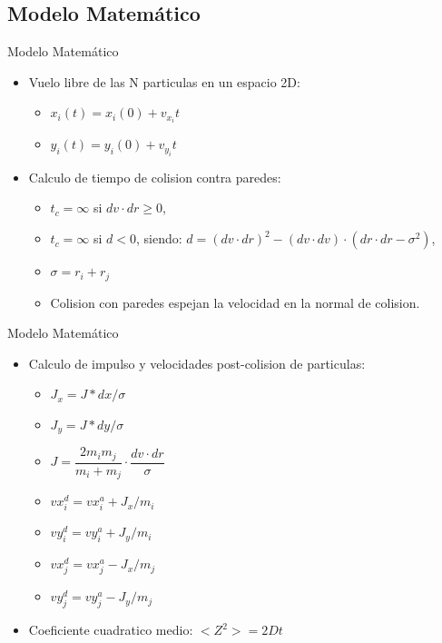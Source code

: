 \documentclass{beamer}
\begin{document}
\subsection{Modelo Matemático}
\begin{frame}{Modelo Matemático}
  \begin{itemize}
    \item Vuelo libre de las N particulas en un espacio 2D:
      \begin{itemize}
        \item $x_i(t) = x_i(0) + v_{x_i} t$
        \item $y_i(t) = y_i(0) + v_{y_i} t$
      \end{itemize}
    \item Calculo de tiempo de colision contra paredes:
      \begin{itemize}
        \item $t_{c} = \infty$ si $dv \cdot dr \geqslant 0$,
      \item $t_{c} = \infty$ si $d < 0$, siendo: $d = (dv \cdot dr)^2 - (dv \cdot dv)\cdot(dr \cdot dr - \sigma^2 )$,
        \item $\sigma = r_i + r_j$
        \item Colision con paredes espejan la velocidad en la normal de colision.
      \end{itemize}
  \end{itemize}
\end{frame}

\begin{frame}{Modelo Matemático}
  \begin{itemize}
    \item Calculo de impulso y velocidades post-colision de particulas:
      \begin{itemize}
        \item $J_x = J*dx/\sigma$
        \item $J_y = J*dy/\sigma$
        \item $J = \dfrac{2 m_i m_j}{m_i + m_j} \cdot \dfrac{dv \cdot dr}{\sigma}$
        \item $vx_i^d = vx_i^a + J_x/m_i$
        \item $vy_i^d = vy_i^a + J_y/m_i$
        \item $vx_j^d = vx_j^a - J_x/m_j$
        \item $vy_j^d = vy_j^a - J_y/m_j$
      \end{itemize}
    \item Coeficiente cuadratico medio: $<Z^2> = 2Dt$
  \end{itemize}
\end{frame}
\end{document}
